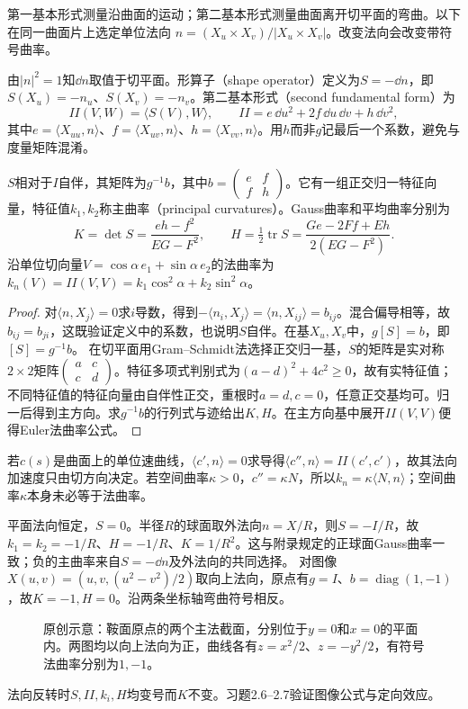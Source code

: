 第一基本形式测量沿曲面的运动；第二基本形式测量曲面离开切平面的弯曲。以下在同一曲面片上选定单位法向
$n=(X_u\times X_v)/|X_u\times X_v|$。改变法向会改变带符号曲率。
\begin{definition}[形算子与第二基本形式]
由$|n|^2=1$知$\dd n$取值于切平面。形算子（shape operator）定义为$S=-\dd n$，即$S(X_u)=-n_u$、$S(X_v)=-n_v$。第二基本形式（second fundamental form）为
\[
 II(V,W)=\langle S(V),W\rangle,
 \qquad II=e\,\dd u^2+2f\,\dd u\,\dd v+h\,\dd v^2,
\]
其中$e=\langle X_{uu},n\rangle$、$f=\langle X_{uv},n\rangle$、$h=\langle X_{vv},n\rangle$。用$h$而非$g$记最后一个系数，避免与度量矩阵混淆。
\end{definition}
\begin{theorem}\label{thm:shape}
$S$相对于$I$自伴，其矩阵为$g^{-1}b$，其中$b=\left(\begin{smallmatrix}e&f\\f&h\end{smallmatrix}\right)$。它有一组正交归一特征向量，特征值$k_1,k_2$称主曲率（principal curvatures）。Gauss曲率和平均曲率分别为
\[
 K=\det S=\frac{eh-f^2}{EG-F^2},\qquad
 H=\tfrac12\operatorname{tr}S=\frac{Ge-2Ff+Eh}{2(EG-F^2)}.
\]
沿单位切向量$V=\cos\alpha\,e_1+\sin\alpha\,e_2$的法曲率为
$k_n(V)=II(V,V)=k_1\cos^2\alpha+k_2\sin^2\alpha$。
\end{theorem}
\begin{proof}
对$\langle n,X_j\rangle=0$求$i$导数，得到$-\langle n_i,X_j\rangle=\langle n,X_{ij}\rangle=b_{ij}$。混合偏导相等，故$b_{ij}=b_{ji}$，这既验证定义中的系数，也说明$S$自伴。在基$X_u,X_v$中，$g[S]=b$，即$[S]=g^{-1}b$。
在切平面用Gram--Schmidt法选择正交归一基，$S$的矩阵是实对称$2\times2$矩阵$\left(\begin{smallmatrix}a&c\\c&d\end{smallmatrix}\right)$。特征多项式判别式为$(a-d)^2+4c^2\geq0$，故有实特征值；不同特征值的特征向量由自伴性正交，重根时$a=d,c=0$，任意正交基均可。归一后得到主方向。求$g^{-1}b$的行列式与迹给出$K,H$。在主方向基中展开$II(V,V)$便得Euler法曲率公式。
\end{proof}
若$c(s)$是曲面上的单位速曲线，$\langle c',n\rangle=0$求导得$\langle c'',n\rangle=II(c',c')$，故其法向加速度只由切方向决定。若空间曲率$\kappa>0$，$c''=\kappa N$，所以$k_n=\kappa\langle N,n\rangle$；空间曲率$\kappa$本身未必等于法曲率。
\begin{example}[平面、球面与鞍面]
平面法向恒定，$S=0$。半径$R$的球面取外法向$n=X/R$，则$S=-I/R$，故$k_1=k_2=-1/R$、$H=-1/R$、$K=1/R^2$。这与附录规定的正球面Gauss曲率一致；负的主曲率来自$S=-\dd n$及外法向的共同选择。
对图像$X(u,v)=(u,v,(u^2-v^2)/2)$取向上法向，原点有$g=I$、$b=\operatorname{diag}(1,-1)$，故$K=-1,H=0$。沿两条坐标轴弯曲符号相反。
\end{example}
\begin{figure}[htbp]
\centering

\caption{原创示意：鞍面原点的两个主法截面，分别位于$y=0$和$x=0$的平面内。两图均以向上法向为正，曲线各有$z=x^2/2$、$z=-y^2/2$，有符号法曲率分别为$1,-1$。}
\end{figure}
法向反转时$S,II,k_i,H$均变号而$K$不变。习题2.6--2.7验证图像公式与定向效应。
